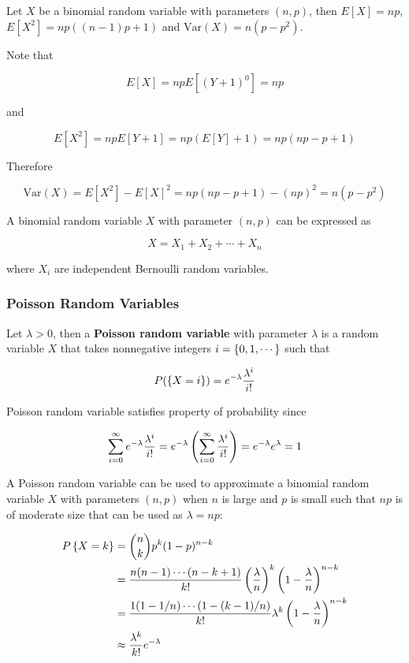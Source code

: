 \documentclass[a4paper,12pt]{article}
\begin{document}
\begin{crl}
  Let $X$ be a binomial random variable with parameters $(n,p)$, then $E[X]=np$, $E[X^{2}]=np((n-1)p+1)$ and $\mathrm{Var}(X)=n(p-p^{2})$.\n

  \prf Note that

  $$E[X]=npE[(Y+1)^{0}]=np$$\s

  and

  $$E[X^{2}]=npE[Y+1]=np(E[Y]+1)=np(np-p+1)$$\s

  Therefore

  $$\mathrm{Var}(X)=E[X^{2}]-E[X]^{2}=np(np-p+1)-(np)^{2}=n(p-p^{2})$$
\end{crl}\n

A binomial random variable $X$ with parameter $(n,p)$ can be expressed as

$$X=X_{1}+X_{2}+\cdots+X_{n}$$\s

where $X_{i}$ are independent Bernoulli random variables.

\subsubsection{Poisson Random Variables}
\begin{dft}
  Let $\lambda>0$, then a \textbf{Poisson random variable} with parameter $\lambda$ is a random variable $X$ that takes nonnegative integers $i=\left\{ 0,1,\cdots\right\}$ such that

  $$P(\left\{ X=i\right\})=e^{-\lambda}\frac{\lambda^{i}}{i!}$$
\end{dft}\n

Poisson random variable satisfies property of probability since

$$\sum_{i=0}^{\infty}e^{-\lambda}\frac{\lambda^{i}}{i!}=e^{-\lambda}\left( \sum_{i=0}^{\infty}\frac{\lambda^{i}}{i!}\right)=e^{-\lambda}e^{\lambda}=1$$\s

A Poisson random variable can be used to approximate a binomial random variable $X$ with parameters $(n,p)$ when $n$ is large and $p$ is small such that $np$ is of moderate size that can be used as $\lambda=np$:

$$\begin{aligned}[t]
  P\left\{ X=k\right\}&=\binom{n}{k}p^{k}(1-p)^{n-k}\\
  &=\frac{n(n-1)\cdots(n-k+1)}{k!}\left( \frac{\lambda}{n}\right)^{k}\left( 1-\frac{\lambda}{n}\right)^{n-k}\\
  &=\frac{1(1-1/n)\cdots(1-(k-1)/n)}{k!}\lambda^{k}\left( 1-\frac{\lambda}{n}\right)^{n-k}\\
  &\approx\frac{\lambda^{k}}{k!}e^{-\lambda}
\end{aligned}$$\s
\end{document}
